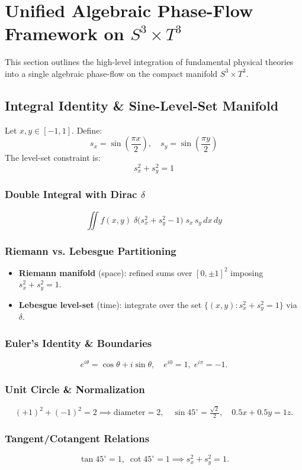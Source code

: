 ﻿\documentclass[12pt]{article}
\begin{document}
\section{Unified Algebraic Phase-Flow Framework on $S^3 \times T^3$}
This section outlines the high-level integration of fundamental physical theories into a single algebraic phase-flow on the compact manifold $S^3 \times T^3$.

\subsection{Integral Identity \& Sine-Level-Set Manifold}
Let $x,y\in[-1,1]$. Define:
$$
s_x = \sin\left(\frac{\pi x}{2}\right),
\quad
s_y = \sin\left(\frac{\pi y}{2}\right)
$$
The level-set constraint is:
$$
s_x^2 + s_y^2 = 1
$$

\subsubsection{Double Integral with Dirac $\delta$}
$$
\iint f(x,y)
\;\delta\bigl(s_x^2 + s_y^2 - 1\bigr)
\;s_x\,s_y\,dx\,dy
$$

\subsubsection{Riemann vs. Lebesgue Partitioning}
\begin{itemize}
   \item \textbf{Riemann manifold} (space): refined sums over $[0,\pm1]^2$ imposing $s_x^2+s_y^2=1$.
   \item \textbf{Lebesgue level-set} (time): integrate over the set $\{(x,y):s_x^2+s_y^2=1\}$ via $\delta$.
\end{itemize}

\subsubsection{Euler's Identity \& Boundaries}
$$e^{i\theta}=\cos\theta + i\sin\theta,\quad e^{i0}=1,\;e^{i\pi}=-1.$$

\subsubsection{Unit Circle \& Normalization}
$$(+1)^2+(-1)^2=2\implies\text{diameter}=2,\quad\sin45^\circ=\tfrac{\sqrt2}{2},\quad 0.5x+0.5y=1z.$$

\subsubsection{Tangent/Cotangent Relations}
$$\tan45^\circ=1,\;\cot45^\circ=1\implies s_x^2+s_y^2=1.$$
\end{document}
